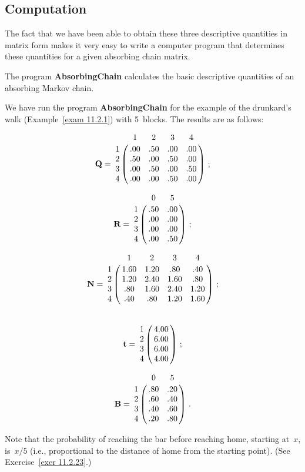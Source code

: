 \subsection*{Computation}
The fact that we have been able to obtain these three descriptive quantities in
matrix form makes it very easy to write a computer program that determines
these quantities for a given absorbing chain matrix.   

The program {\bf AbsorbingChain} calculates the basic
descriptive quantities of an
absorbing Markov chain.

We have run the program {\bf  AbsorbingChain} for the example of the
drunkard's walk (Example~\ref{exam 11.2.1}) with
5~blocks. 
The results are as follows:

$$
\mat{Q}  = \bordermatrix{
  & 1     & 2     & 3     & 4  \cr
1 & .00   & .50   & .00   & .00\cr
2 & .50   & .00   & .50   & .00\cr
3 & .00   & .50   & .00   & .50\cr 
4 & .00   & .00   & .50   & .00}\ ;
$$

$$
\mat{R}  = \bordermatrix{
  & 0     & 5     \cr
1 & .50   & .00   \cr
2 & .00   & .00   \cr
3 & .00   & .00   \cr 
4 & .00   & .50   }\ ;
$$

$$
\mat{N}  = \bordermatrix{
  & 1      & 2      & 3      &  4  \cr
1 & 1.60   & 1.20   & .80    & .40 \cr
2 & 1.20   & 2.40   & 1.60   & .80 \cr
3 & .80    & 1.60   & 2.40   & 1.20\cr 
4 & .40    & .80    & 1.20   & 1.60}\ ;
$$

$$
\mat{t}  = \bordermatrix{
 &  \cr
1  & 4.00 \cr
2  & 6.00 \cr
3  & 6.00 \cr
4  & 4.00}\ ;
$$

$$
\mat{B}  = \bordermatrix{
  & 0     & 5     \cr
1 & .80   & .20   \cr
2 & .60   & .40   \cr
3 & .40   & .60   \cr 
4 & .20   & .80   }\ .
$$
 
Note that the probability of reaching the bar before reaching home, starting
at~$x$, is~$x/5$ (i.e., proportional to the distance of home from the starting
point).  (See Exercise~\ref{exer 11.2.23}.)

